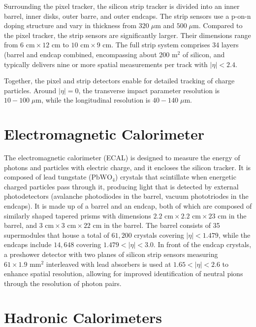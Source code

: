 Surrounding the pixel tracker, the silicon strip tracker is divided into an inner barrel, inner disks, outer barre, and outer endcaps. The strip sensors use a p-on-n doping structure and vary in thickness from $320 \;\mu\text{m}$ and $500 \;\mu\text{m}$. Compared to the pixel tracker, the strip sensors are significantly larger. Their dimensions range from $6\text{ cm} \times 12 \text{ cm}$ to $10\text{ cm} \times 9 \text{ cm}$. The full strip system comprises 34 layers (barrel and endcap combined, encompassing about $200 \text{ m}^2$ of silicon, and typically delivers nine or more spatial measurements per track with $|\eta|<2.4$.

Together, the pixel and strip detectors enable for detailed tracking of charge particles. Around $|\eta| = 0$, the transverse impact parameter resolution is $10-100 \;\mu\text{m}$, while the longitudinal resolution is $40-140 \;\mu\text{m}$.

\section{Electromagnetic Calorimeter}
\label{sec:ECAL}

The electromagnetic calorimeter (ECAL) is designed to measure the energy of photons and particles with electric charge, and it encloses the silicon tracker. It is composed of lead tungstate ($\text{PbWO}_4$) crystals that scintillate when energetic charged particles pass through it, producing light that is detected by external photodetectors (avalanche photodiodes in the barrel, vacuum phototriodes in the endcaps). It is made up of a barrel and an endcap, both of which are composed of similarly shaped tapered prisms with dimensions $2.2\text{ cm}\times2.2\text{ cm}\times23\text{ cm}$ in the barrel, and $3\text{ cm}\times3\text{ cm}\times22\text{ cm}$ in the barrel. The barrel consists of 35 supermodules that house a total of $61,200$ crystals covering $|\eta| <1.479$, while the endcaps include $14,648$ covering $1.479 <|\eta|<3.0$. In front of the endcap crystals, a preshower detector with two planes of silicon strip sensors measuring $61\times1.9\text{ mm}^2$ interleaved with lead absorbers is used at $1.65 <|\eta|<2.6$ to enhance spatial resolution, allowing for improved identification of neutral pions through the resolution of photon pairs.

\section{Hadronic Calorimeters}
\label{sec:HCAL}

